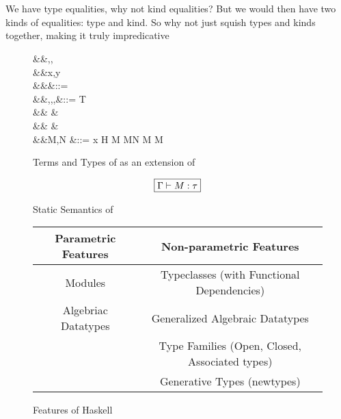 \documentclass[manuscript,screen,nonacm]{acmart}
\begin{document}
\section{\SFK}\label{sec:sfk} %
We have type equalities, why not kind equalities?
But we would then have two kinds of equalities: type and kind.
So why not just squish types and kinds together, making it truly impredicative

\begin{figure}[ht]
  \centering
  \begin{syntax}
     &&\alpha,\beta,\gamma \\
     &&x,y          \\
         &&\kappa                  &::= \star \mid \kappa \to \kappa \mid \syntaxhl{\tau \sim \sigma}\\
         &&\tau,\sigma,\gamma,\nu  &::= \alpha \mid T \mid {} \mid \tau \to \tau \mid \Forall {\alpha\co\kappa} \tau\\
    &&                        &\syntaxhl{\mid \sym \Co \mid \trans \nu \Co \mid \Co\At\tau \mid \Left \Co \mid \Right \Co} \\
    &&                        &\syntaxhl{\mid \Cast \Co \Co}\\
         &&M,N                     &::= x \mid H \mid {} M \mid M\App N \mid \TLam{\tau\co\kappa} M \mid M\App \tau
  \end{syntax}
  \caption{Terms and Types of \SFK as an extension of \SFC}
  \label{fig:system-fck-syntax}
\end{figure}


\begin{figure}[ht]
  \centering
  \begin{gather*}
    \fbox{$\Gamma \vdash M : \tau$}
  \end{gather*}
  \caption{Static Semantics of \SFK}
  \label{fig:sfk-typing}
\end{figure}


\begin{figure}[ht]
  \centering
  \begin{tabular}[ht]{c | c}
    Parametric Features & Non-parametric Features \\
    \hline
    Modules             & Typeclasses (with Functional Dependencies)\\
    Algebriac Datatypes & Generalized Algebraic Datatypes\\
                        & Type Families (Open, Closed, Associated types)\\
                        & Generative Types (newtypes)
  \end{tabular}
  \caption{Features of Haskell}
  \label{fig:haskell-lang-features}
\end{figure}
\end{document}
